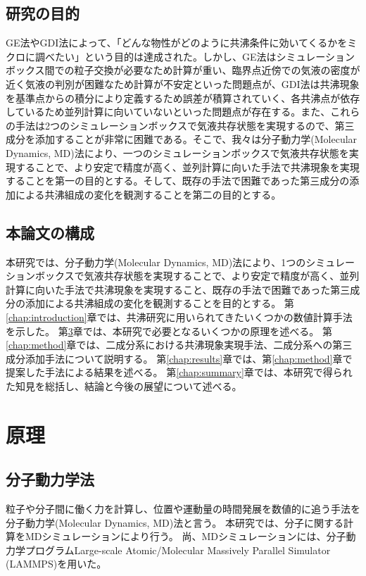 \documentclass[titlepage]{jsreport}
\begin{document}
\section{研究の目的} \label{introduction:purpose}
GE法やGDI法によって、「どんな物性がどのように共沸条件に効いてくるかをミクロに調べたい」という目的は達成された。しかし、GE法はシミュレーションボックス間での粒子交換が必要なため計算が重い、臨界点近傍での気液の密度が近く気液の判別が困難なため計算が不安定といった問題点が、GDI法は共沸現象を基準点からの積分により定義するため誤差が積算されていく、各共沸点が依存しているため並列計算に向いていないといった問題点が存在する。また、これらの手法は2つのシミュレーションボックスで気液共存状態を実現するので、第三成分を添加することが非常に困難である。そこで、我々は分子動力学(Molecular Dynamics, MD)法により、一つのシミュレーションボックスで気液共存状態を実現することで、より安定で精度が高く、並列計算に向いた手法で共沸現象を実現することを第一の目的とする。そして、既存の手法で困難であった第三成分の添加による共沸組成の変化を観測することを第二の目的とする。


\section{本論文の構成} \label{introduction:constitution}
本研究では、分子動力学(Molecular Dynamics, MD)法により、1つのシミュレーションボックスで気液共存状態を実現することで、より安定で精度が高く、並列計算に向いた手法で共沸現象を実現すること、既存の手法で困難であった第三成分の添加による共沸組成の変化を観測することを目的とする。
第\ref{chap:introduction}章では、共沸研究に用いられてきたいくつかの数値計算手法を示した。
第\ref{chap:principle}章では、本研究で必要となるいくつかの原理を述べる。
第\ref{chap:method}章では、二成分系における共沸現象実現手法、二成分系への第三成分添加手法について説明する。
第\ref{chap:results}章では、第\ref{chap:method}章で提案した手法による結果を述べる。
第\ref{chap:summary}章では、本研究で得られた知見を総括し、結論と今後の展望について述べる。


\chapter{原理} \label{chap:principle}
\section{分子動力学法}\label{principle-sec:molecular-dynamics}
粒子や分子間に働く力を計算し、位置や運動量の時間発展を数値的に追う手法を分子動力学(Molecular Dynamics, MD)法と言う。
本研究では、分子に関する計算をMDシミュレーションにより行う。
尚、MDシミュレーションには、分子動力学プログラムLarge-scale Atomic/Molecular Massively Parallel Simulator\,(LAMMPS)\cite{lammps}を用いた。
\end{document}
